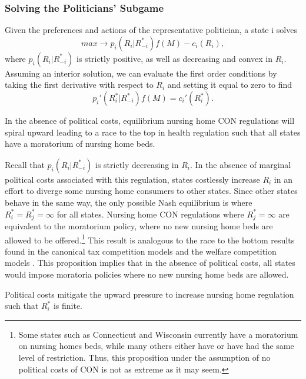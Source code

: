 \documentclass[../Main.tex]{subfiles}
\begin{document}
\subsubsection{Solving the Politicians' Subgame}

Given the preferences and actions of the representative politician, a state i solves
\begin{equation}max \rightarrow p_i(R_i|R_{-i}^*)f(M) -c_i(R_i),\end{equation} where $p_i(R_i|R_{-i}^*)$ is strictly positive, as well as decreasing and convex in $R_i$. Assuming an interior solution, we can evaluate the first order conditions by taking the first derivative with respect to $R_i$ and setting it equal to zero to find \begin{equation}p_i'(R_i^*|R_{-i}^*)f(M) = c_i'(R_i^*).\end{equation} 

 \begin{Proposition}
In the absence of political costs, equilibrium nursing home CON regulations will spiral upward leading to a race to the top in health regulation such that all states have a moratorium of nursing home beds. 
\end{Proposition}

Recall that $p_i(R_i|R_{-i}^*)$ is strictly decreasing in $R_i$. In the absence of marginal political costs associated with this regulation, states costlessly increase $R_i$ in an effort to diverge some nursing home consumers to other states. Since other states behave in the same way, the only possible Nash equilibrium is where $R_i^* = R_j^* = \infty $ for all states. Nursing home CON regulations where $R_j^* = \infty $ are equivalent to the moratorium policy, where no new nursing home beds are allowed to be offered.\footnote{Some states such as Connecticut and Wisconsin currently have a moratorium on nursing homes beds, while many others either have or have had the same level of restriction. Thus, this proposition under the assumption of no political costs of CON is not as extreme as it may seem.} This result is analogous to the race to the bottom results found in the canonical tax competition models \citep{zodrow1986pigou, basinger2004remodeling} and the welfare competition models \citep{gramlich1984migration,peterson1989american,schram1998without}. This proposition implies that in the absence of political costs, all states would impose moratoria policies where no new nursing home beds are allowed.


\begin{Proposition}
Political costs mitigate the upward pressure to increase nursing home regulation such that $R_i^*$ is finite. 
\end{Proposition}
\end{document}
